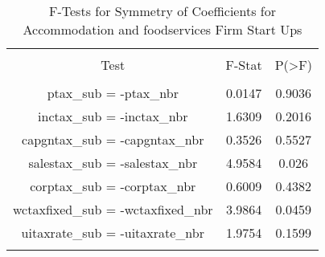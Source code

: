 
\begin{table}[!htbp] \centering 
  \caption{F-Tests for Symmetry of Coefficients for Accommodation and foodservices Firm Start Ups} 
  \label{72Ftests} 
\begin{tabular}{@{\extracolsep{5pt}} ccc} 
\\[-1.8ex]\hline 
\hline \\[-1.8ex] 
Test & F-Stat & P(\textgreater F) \\ 
\hline \\[-1.8ex] 
ptax\_sub = -ptax\_nbr & 0.0147 & 0.9036 \\ 
inctax\_sub = -inctax\_nbr & 1.6309 & 0.2016 \\ 
capgntax\_sub = -capgntax\_nbr & 0.3526 & 0.5527 \\ 
salestax\_sub = -salestax\_nbr & 4.9584 & 0.026 \\ 
corptax\_sub = -corptax\_nbr & 0.6009 & 0.4382 \\ 
wctaxfixed\_sub = -wctaxfixed\_nbr & 3.9864 & 0.0459 \\ 
uitaxrate\_sub = -uitaxrate\_nbr & 1.9754 & 0.1599 \\ 
\hline \\[-1.8ex] 
\end{tabular} 
\end{table} 
